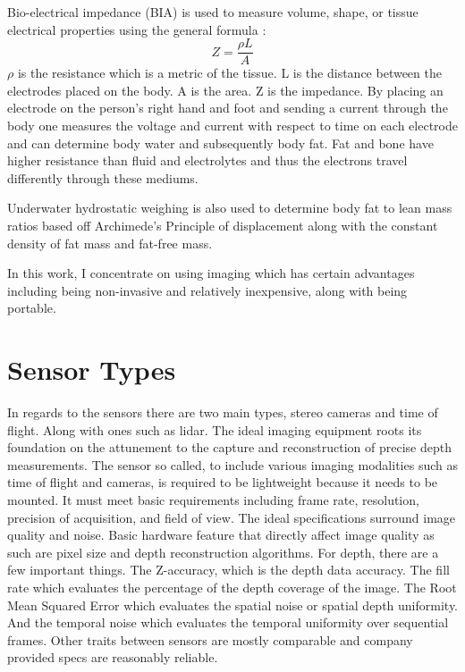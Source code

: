 Bio-electrical impedance (BIA) is used to measure volume, shape, or tissue electrical properties using the general formula \cite{jaffrin2008body}:
\begin{equation}
	Z = \frac{\rho L}{A}
\end{equation}
$\rho$ is the resistance which is a metric of the tissue. L is the distance between the electrodes placed on the body. A is the area. Z is the impedance. By placing an electrode on the person's right hand and foot and sending a current through the body one measures the voltage and current with respect to time on each electrode and can determine body water and subsequently body fat. Fat and bone have higher resistance than fluid and electrolytes and thus the electrons travel differently through these mediums.

Underwater hydrostatic weighing is also used to determine body fat to lean mass ratios based off Archimede's Principle of displacement along with the constant density of fat mass and fat-free mass.

In this work, I concentrate on using imaging which has certain advantages including being non-invasive and relatively inexpensive, along with being portable.
\section{Sensor Types}
In regards to the sensors there are two main types, stereo cameras and time of flight. Along with ones such as lidar. The ideal imaging equipment roots its foundation on the attunement to the capture and reconstruction of precise depth measurements. The sensor so called, to include various imaging
modalities such as time of flight and cameras, is required to be lightweight because it needs to be
mounted. It must meet basic requirements including frame rate, resolution, precision of
acquisition, and field of view. The ideal specifications surround image quality and noise. Basic hardware feature that directly affect image quality as such are pixel size and depth reconstruction algorithms. For depth, there
are a few important things. The Z-accuracy, which is the depth data accuracy. The fill rate which
evaluates the percentage of the depth coverage of the image. The Root Mean Squared Error which evaluates the
spatial noise or spatial depth uniformity. And the temporal noise which evaluates the temporal
uniformity over sequential frames. Other traits between sensors are mostly comparable and
company provided specs are reasonably reliable.


